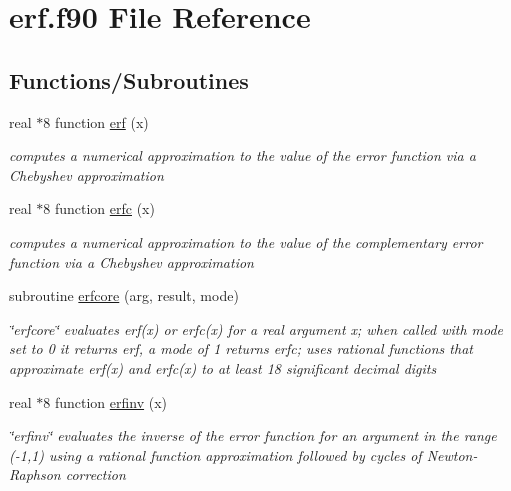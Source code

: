 \hypertarget{erf_8f90}{\section{erf.\-f90 File Reference}
\label{erf_8f90}
}
\subsection*{Functions/\-Subroutines}
\begin{DoxyCompactItemize}
\item 
real $\ast$8 function \hyperlink{erf_8f90_aec01c4a7b1dbfd12041e88a6e49435f8}{erf} (x)
\begin{DoxyCompactList}\small\item\em computes a numerical approximation to the value of the error function via a Chebyshev approximation \end{DoxyCompactList}\item 
real $\ast$8 function \hyperlink{erf_8f90_a562bafa2a6bbcdf9d5034bb87c3a6190}{erfc} (x)
\begin{DoxyCompactList}\small\item\em computes a numerical approximation to the value of the complementary error function via a Chebyshev approximation \end{DoxyCompactList}\item 
subroutine \hyperlink{erf_8f90_a3db66269539046169e1596d5b4490fc2}{erfcore} (arg, result, mode)
\begin{DoxyCompactList}\small\item\em \char`\"{}erfcore\char`\"{} evaluates erf(x) or erfc(x) for a real argument x; when called with mode set to 0 it returns erf, a mode of 1 returns erfc; uses rational functions that approximate erf(x) and erfc(x) to at least 18 significant decimal digits \end{DoxyCompactList}\item 
real $\ast$8 function \hyperlink{erf_8f90_aaed58d47c1f06be9b47492e1f6a57710}{erfinv} (x)
\begin{DoxyCompactList}\small\item\em \char`\"{}erfinv\char`\"{} evaluates the inverse of the error function for an argument in the range (-\/1,1) using a rational function approximation followed by cycles of Newton-\/\-Raphson correction \end{DoxyCompactList}\end{DoxyCompactItemize}


